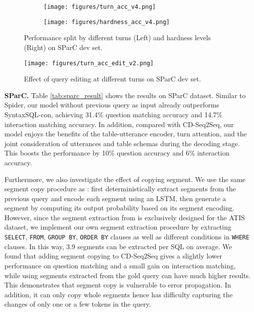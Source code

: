 \documentclass[11pt,a4paper]{article}
\newcommand{\syncon}{SyntaxSQL-con}
\begin{document}
\begin{figure*}[t!]
     \centering
     \begin{subfigure}[t]{0.46\textwidth}
         \centering
         \texttt{[image: figures/turn\_acc\_v4.png]}
         \vspace{-2mm}
         \label{fig:turn_acc}
     \end{subfigure}\begin{subfigure}[t]{0.46\textwidth}
         \centering
         \texttt{[image: figures/hardness\_acc\_v4.png]}
         \vspace{-2mm}
         \label{fig:hardness_acc}
     \end{subfigure}
     \vspace{-5mm}
\caption{Performance split by different turns (Left) and hardness levels (Right) on SParC dev set.}
\vspace{-4mm}
\label{fig:sparc_dev}
\end{figure*}

\begin{figure}[t!]
  \centering
  \texttt{[image: figures/turn\_acc\_edit\_v2.png]}
  \caption{Effect of query editing at different turns on SParC dev set.}
  \vspace{-5mm}
  \label{fig:turn_acc_edit}
\end{figure}

\textbf{SParC.}
Table \ref{tab:sparc_result} shows the results on SParC dataset.
Similar to Spider, our model without previous query as input already outperforms \syncon{}, achieving 31.4\% question matching accuracy and 14.7\% interaction matching accuracy.
In addition, compared with CD-Seq2Seq, our model enjoys the benefits of the table-utterance encoder, turn attention, and the joint consideration of utterances and table schemas during the decoding stage.
This boosts the performance by 10\% question accuracy and 6\% interaction accuracy.

Furthermore, we also investigate the effect of copying segment.
We use the same segment copy procedure as : first deterministically extract segments from the previous query and encode each segment using an LSTM, then generate a segment by computing its output probability based on its segment encoding.
However, since the segment extraction from  is exclusively designed for the ATIS dataset, we implement our own segment extraction procedure by extracting \texttt{SELECT}, \texttt{FROM}, \texttt{GROUP BY}, \texttt{ORDER BY} clauses as well as different conditions in \texttt{WHERE} clauses.
In this way, 3.9 segments can be extracted per SQL on average.
We found that adding segment copying to CD-Seq2Seq gives a slightly lower performance on question matching and a small gain on interaction matching, while using segments extracted from the gold query can have much higher results.
This demonstrates that segment copy is vulnerable to error propagation. In addition, it can only copy whole segments hence has difficulty capturing the changes of only one or a few tokens in the query.
\end{document}
